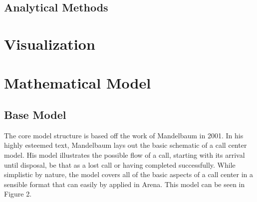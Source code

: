 \documentclass[12pt]{article}
\begin{document}
	\subsection{Analytical Methods}
	



























































\section{Visualization}



\section{Mathematical Model}

	\subsection{Base Model}
The core model structure is based off the work of Mandelbaum in 2001\cite{mandelbaum}.  In his highly esteemed text, Mandelbaum lays out the basic schematic of a call center model.  His model illustrates the possible flow of a call, starting with its arrival until disposal, be that as a lost call or having completed successfully.  While simplistic by nature, the model covers all of the basic aspects of a call center in a sensible format that can easily by applied in Arena.  This model can be seen in Figure 2.  
\end{document}
